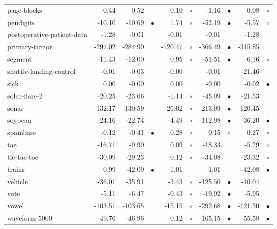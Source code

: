 \begin{table}[thb]
{\begin{tabular}{lrr@{\hspace{0.1cm}}cr@{\hspace{0.1cm}}cr@{\hspace{0.1cm}}cr@{\hspace{0.1cm}}c}
page-blocks &   -0.44 &   -0.52 &           &   -0.10 &  $\circ$ &   -1.16 & $\bullet$ &    0.08 &   $\circ$\\
pendigits &  -10.10 &  -10.69 & $\bullet$ &    1.74 &  $\circ$ &  -52.19 & $\bullet$ &   -5.57 &   $\circ$\\
postoperative-patient-data &   -1.28 &   -0.01 &           &   -0.01 &          &   -0.01 &           &   -1.28 &          \\
primary-tumor & -297.02 & -284.90 &           & -120.47 &  $\circ$ & -366.49 & $\bullet$ & -315.85 &          \\
segment &  -11.43 &  -12.00 &           &    0.95 &  $\circ$ &  -51.51 & $\bullet$ &   -6.16 &   $\circ$\\
shuttle-landing-control &   -0.01 &   -0.03 &           &   -0.00 &          &   -0.01 &           &  -21.46 &          \\
sick &    0.00 &   -0.00 &           &    0.00 &          &   -0.00 &           &   -0.02 & $\bullet$\\
solar-flare-2 &  -20.25 &  -23.66 &           &   -1.14 &  $\circ$ &  -45.09 & $\bullet$ &  -21.53 &          \\
sonar & -132.17 & -130.59 &           &  -26.02 &  $\circ$ & -213.09 & $\bullet$ & -120.45 &          \\
soybean &  -24.16 &  -22.74 &           &   -4.49 &  $\circ$ & -112.98 & $\bullet$ &  -36.20 & $\bullet$\\
spambase &   -0.12 &   -0.41 & $\bullet$ &    0.28 &  $\circ$ &    0.15 &   $\circ$ &    0.27 &   $\circ$\\
tae &  -16.71 &   -9.90 &           &    0.09 &  $\circ$ &  -18.33 &           &   -5.29 &   $\circ$\\
tic-tac-toe &  -30.09 &  -29.23 &           &    0.12 &  $\circ$ &  -34.08 &           &  -23.32 &   $\circ$\\
trains &    0.99 &  -42.09 & $\bullet$ &    1.01 &          &    1.01 &           &  -42.08 & $\bullet$\\
vehicle &  -36.01 &  -35.91 &           &   -3.43 &  $\circ$ & -125.50 & $\bullet$ &  -40.04 &          \\
vote &   -5.11 &   -6.47 &           &   -0.43 &  $\circ$ &  -19.92 & $\bullet$ &   -5.95 &          \\
vowel & -103.51 & -103.65 &           &  -15.15 &  $\circ$ & -292.68 & $\bullet$ & -121.50 & $\bullet$\\
waveform-5000 &  -49.76 &  -46.96 &           &   -0.12 &  $\circ$ & -165.15 & $\bullet$ &  -55.58 & $\bullet$\\

\end{tabular}}
\end{table}
